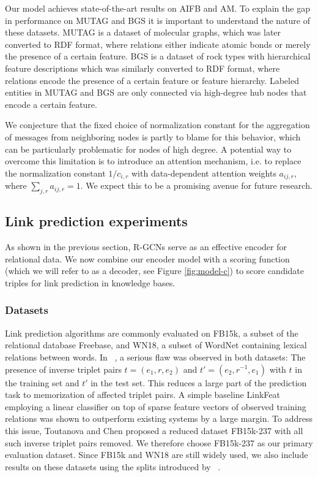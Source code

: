 \documentclass[letterpaper]{article} \usepackage{aaai18}  \usepackage{times}  \usepackage{helvet}  \usepackage{courier}  \usepackage{url}  \usepackage{graphicx}  \frenchspacing
\newcommand{\citet}[1]{\citeauthor{#1}~\shortcite{#1}}
\begin{document}
Our model achieves state-of-the-art results on AIFB and AM. To explain the gap in performance on MUTAG and BGS it is important to understand the nature of these datasets. MUTAG is a dataset of molecular graphs, which was later converted to RDF format, where relations either indicate atomic bonds or merely the presence of a certain feature. BGS is a dataset of rock types with hierarchical feature descriptions which was similarly converted to RDF format, where relations encode the presence of a certain feature or feature hierarchy. Labeled entities in MUTAG and BGS are only connected via high-degree hub nodes that encode a certain feature.

We conjecture that the fixed choice of normalization constant for the aggregation of messages from neighboring nodes is partly to blame for this behavior, which can be particularly problematic for nodes of high degree. A potential way to overcome this limitation is to introduce an attention mechanism, i.e. to replace the normalization constant $1/c_{i,r}$ with data-dependent attention weights $a_{ij,r}$, where $\sum_{j,r}a_{ij,r}=1$. We expect this to be a promising avenue for future research.
 
\subsection{Link prediction experiments}
As shown in the previous section, R-GCNs serve as an effective encoder for relational data. We now combine our encoder model with a scoring function (which we will refer to as a decoder, see Figure \ref{fig:model-c}) to score candidate triples for link prediction in knowledge bases.

\subsubsection{Datasets}
Link prediction algorithms are commonly evaluated on FB15k, a subset of the relational database Freebase, and WN18, a subset of WordNet containing lexical relations between words. In \citet{toutanova2015observed}, a serious flaw was observed in both datasets: The presence of inverse triplet pairs $t = (e_1, r, e_2)$ and $t' = (e_2, r^{-1}, e_1)$ with $t$ in the training set and $t'$ in the test set. This reduces a large part of the prediction task to memorization of affected triplet pairs. A simple baseline LinkFeat employing a linear classifier on top of sparse feature vectors of observed training relations was shown to outperform existing systems by a large margin. To address this issue, Toutanova and Chen proposed a reduced dataset FB15k-237 with all such inverse triplet pairs removed. We therefore choose FB15k-237 as our primary evaluation dataset. Since FB15k and WN18 are still widely used, we also include results on these datasets using the splits introduced by \citet{bordes2013translating}.
\end{document}
